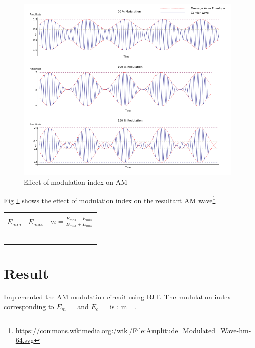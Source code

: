 \documentclass{book}
\begin{document}
\begin{figure}[h]
\label{AMmodindex}
\includegraphics[width=\textwidth]{AMmodindex.png}
\caption{Effect of modulation index on AM}
\end{figure}
\noindent Fig \ref{AMmodindex}  shows the effect of modulation index on the resultant AM wave\footnote{\url{https://commons.wikimedia.org:/wiki/File:Amplitude_Modulated_Wave-hm-64.svg}}
\begin{center}

\begin{tabular}{|l|l|l|}

\hline
 & &\\
 
$E_{min}$  & $E_{max}$ & $m=\frac{E_{max}-E_{min}}{E_{max}+E_{min}}$ \\
 & & \\ \hline
 & & \\ \hline
& & \\ \hline
& & \\ \hline
& & \\ \hline
& & \\ \hline

\end{tabular}
\end{center}


\section*{Result}

Implemented the AM modulation circuit using BJT.
The modulation index corresponding to $E_m=$ \textemdash \textemdash and $E_c=$ \textemdash\textemdash is : m= \textemdash\textemdash .
\end{document}
